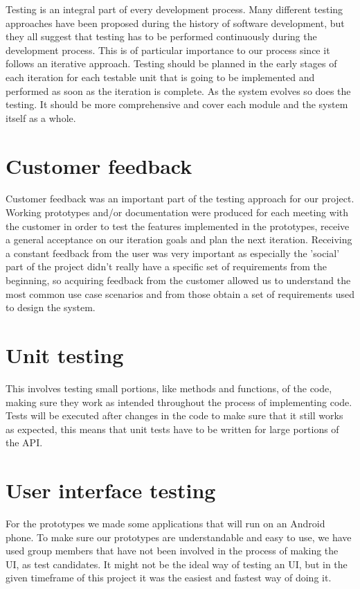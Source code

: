
Testing is an integral part of every development process.
Many different testing approaches have been proposed during the history of
software development, but they all suggest that testing has to be performed continuously
during the development process. This is of particular importance to our process since
it follows an iterative approach. Testing should be planned in the early stages of each
iteration for each testable unit that is going to be implemented and performed as soon as
the iteration is complete. As the system evolves so does the testing. It should be more comprehensive and cover each module and the
system itself as a whole.

\section{Customer feedback}
Customer feedback was an important part of the testing approach for our project.
Working prototypes and/or documentation were produced for each meeting with the customer
in order to test the features implemented in the prototypes, receive a general acceptance
on our iteration goals and plan the next iteration. Receiving a constant feedback from the
user was very important as especially the 'social' part of the project didn't really have a
specific set of requirements from the beginning, so acquiring feedback from the customer allowed
us to understand the most common use case scenarios and from those obtain a set of requirements used
to design the system.

\section{Unit testing}
This involves testing small portions, like methods and functions, of the code, making sure they work 
as intended throughout the process of implementing code. Tests will be executed after changes in the 
code to make sure that it still works as expected, this means that unit tests have to be written for 
large portions of the API.

\section{User interface testing}
For the prototypes we made some applications that will run on an Android phone. To make sure our 
prototypes are understandable and easy to use, we have used group members that have not been 
involved in the process of making the UI, as test candidates. It might not be the ideal way of testing 
an UI, but in the given timeframe of this project it was the easiest and fastest way of doing it.

